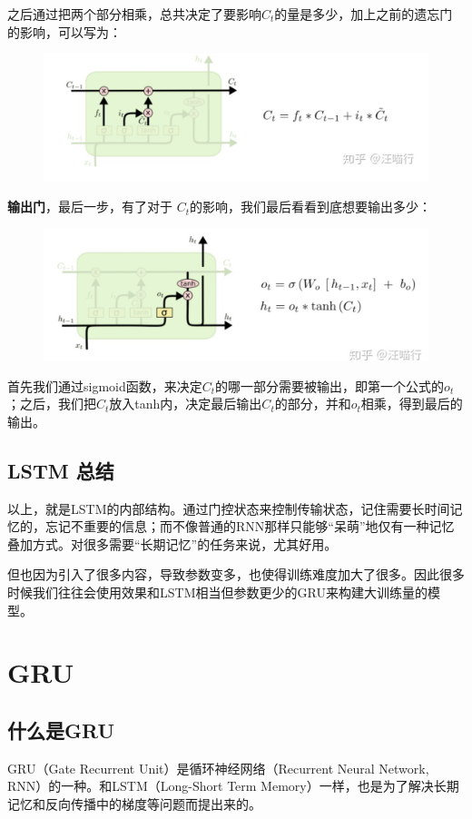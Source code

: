 \documentclass[12pt]{article}
\begin{document}
之后通过把两个部分相乘，总共决定了要影响$C_t$的量是多少，加上之前的遗忘门的影响，可以写为：
\begin{figure}[H]
    \centering
    \includegraphics[width=.8\textwidth]{fig/LSTM_Gate_Forget_Input.png}
\end{figure}

\textbf{输出门}，最后一步，有了对于 $C_t$的影响，我们最后看看到底想要输出多少：
\begin{figure}[H]
    \centering
    \includegraphics[width=.8\textwidth]{fig/LSTM_Gate_Output.png}
\end{figure}
首先我们通过sigmoid函数，来决定$C_t$的哪一部分需要被输出，即第一个公式的$o_t$；之后，我们把$C_t$放入tanh内，决定最后输出$C_t$的部分，并和$o_t$相乘，得到最后的输出。

\subsection{LSTM 总结}
以上，就是LSTM的内部结构。通过门控状态来控制传输状态，记住需要长时间记忆的，忘记不重要的信息；而不像普通的RNN那样只能够“呆萌”地仅有一种记忆叠加方式。对很多需要“长期记忆”的任务来说，尤其好用。

但也因为引入了很多内容，导致参数变多，也使得训练难度加大了很多。因此很多时候我们往往会使用效果和LSTM相当但参数更少的GRU来构建大训练量的模型。

\section{GRU\cite{Everyone_Can_Understand_GRU}}
\subsection{什么是GRU}
GRU（Gate Recurrent Unit）是循环神经网络（Recurrent Neural Network, RNN）的一种。和LSTM（Long-Short Term Memory）一样，也是为了解决长期记忆和反向传播中的梯度等问题而提出来的。
\end{document}
